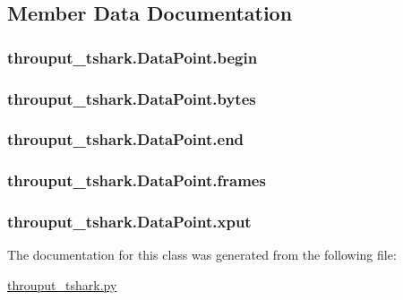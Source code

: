 \subsection{Member Data Documentation}
\hypertarget{classthrouput__tshark_1_1_data_point_a40bc440085947ec24669e6e5f6c5ddb8}{
\subsubsection[{begin}]{\setlength{\rightskip}{0pt plus 5cm}throuput\-\_\-tshark.\-Data\-Point.\-begin}}\label{classthrouput__tshark_1_1_data_point_a40bc440085947ec24669e6e5f6c5ddb8}
\hypertarget{classthrouput__tshark_1_1_data_point_aa9801c08e336468d076ff21e43c817c8}{
\subsubsection[{bytes}]{\setlength{\rightskip}{0pt plus 5cm}throuput\-\_\-tshark.\-Data\-Point.\-bytes}}\label{classthrouput__tshark_1_1_data_point_aa9801c08e336468d076ff21e43c817c8}
\hypertarget{classthrouput__tshark_1_1_data_point_a04d37b8f30e79e4b8caa963cafb5dd70}{
\subsubsection[{end}]{\setlength{\rightskip}{0pt plus 5cm}throuput\-\_\-tshark.\-Data\-Point.\-end}}\label{classthrouput__tshark_1_1_data_point_a04d37b8f30e79e4b8caa963cafb5dd70}
\hypertarget{classthrouput__tshark_1_1_data_point_a54eab4264d03efb8ec893e85259954c3}{
\subsubsection[{frames}]{\setlength{\rightskip}{0pt plus 5cm}throuput\-\_\-tshark.\-Data\-Point.\-frames}}\label{classthrouput__tshark_1_1_data_point_a54eab4264d03efb8ec893e85259954c3}
\hypertarget{classthrouput__tshark_1_1_data_point_aca3722436083ff0c4f619bf32ae2e893}{
\subsubsection[{xput}]{\setlength{\rightskip}{0pt plus 5cm}throuput\-\_\-tshark.\-Data\-Point.\-xput}}\label{classthrouput__tshark_1_1_data_point_aca3722436083ff0c4f619bf32ae2e893}


The documentation for this class was generated from the following file\-:\begin{DoxyCompactItemize}
\item 
\hyperlink{throuput__tshark_8py}{throuput\-\_\-tshark.\-py}\end{DoxyCompactItemize}
